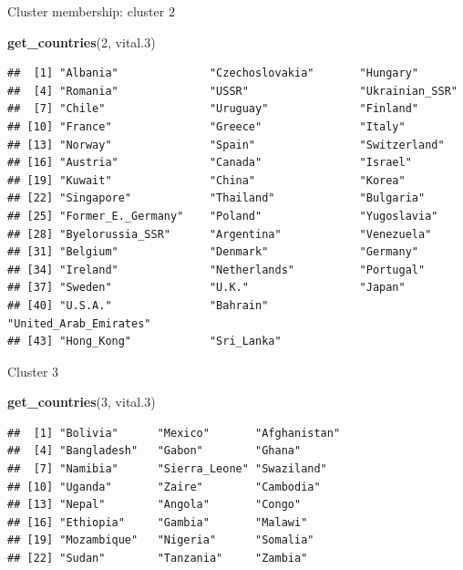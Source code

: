 \documentclass[ignorenonframetext,]{beamer}
\newenvironment{Shaded}{\begin{snugshade}}{\end{snugshade}}
\newcommand{\DecValTok}[1]{\textcolor[rgb]{0.00,0.00,0.81}{#1}}
\newcommand{\FloatTok}[1]{\textcolor[rgb]{0.00,0.00,0.81}{#1}}
\newcommand{\KeywordTok}[1]{\textcolor[rgb]{0.13,0.29,0.53}{\textbf{#1}}}
\newcommand{\NormalTok}[1]{#1}
\begin{document}
\begin{frame}[fragile]{Cluster membership: cluster 2}
\protect\hypertarget{cluster-membership-cluster-2}{}

\scriptsize

\begin{Shaded}
\begin{Highlighting}[]
\KeywordTok{get_countries}\NormalTok{(}\DecValTok{2}\NormalTok{, vital}\FloatTok{.3}\NormalTok{)}
\end{Highlighting}
\end{Shaded}

\begin{verbatim}
##  [1] "Albania"              "Czechoslovakia"       "Hungary"             
##  [4] "Romania"              "USSR"                 "Ukrainian_SSR"       
##  [7] "Chile"                "Uruguay"              "Finland"             
## [10] "France"               "Greece"               "Italy"               
## [13] "Norway"               "Spain"                "Switzerland"         
## [16] "Austria"              "Canada"               "Israel"              
## [19] "Kuwait"               "China"                "Korea"               
## [22] "Singapore"            "Thailand"             "Bulgaria"            
## [25] "Former_E._Germany"    "Poland"               "Yugoslavia"          
## [28] "Byelorussia_SSR"      "Argentina"            "Venezuela"           
## [31] "Belgium"              "Denmark"              "Germany"             
## [34] "Ireland"              "Netherlands"          "Portugal"            
## [37] "Sweden"               "U.K."                 "Japan"               
## [40] "U.S.A."               "Bahrain"              "United_Arab_Emirates"
## [43] "Hong_Kong"            "Sri_Lanka"
\end{verbatim}

\normalsize

\end{frame}

\begin{frame}[fragile]{Cluster 3}
\protect\hypertarget{cluster-3}{}

\begin{Shaded}
\begin{Highlighting}[]
\KeywordTok{get_countries}\NormalTok{(}\DecValTok{3}\NormalTok{, vital}\FloatTok{.3}\NormalTok{)}
\end{Highlighting}
\end{Shaded}

\begin{verbatim}
##  [1] "Bolivia"      "Mexico"       "Afghanistan" 
##  [4] "Bangladesh"   "Gabon"        "Ghana"       
##  [7] "Namibia"      "Sierra_Leone" "Swaziland"   
## [10] "Uganda"       "Zaire"        "Cambodia"    
## [13] "Nepal"        "Angola"       "Congo"       
## [16] "Ethiopia"     "Gambia"       "Malawi"      
## [19] "Mozambique"   "Nigeria"      "Somalia"     
## [22] "Sudan"        "Tanzania"     "Zambia"
\end{verbatim}

\end{frame}
\end{document}
